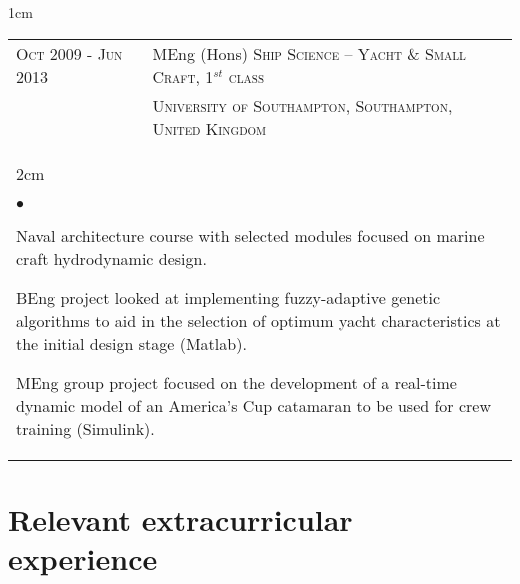 \documentclass[a4paper,10pt]{article}
\newcommand{\squishlist}{
	\begin{list}{$\bullet$}
	{
		\setlength{\itemsep}{0pt}
		\setlength{\parsep}{0pt}
		\setlength{\topsep}{0pt}
		\setlength{\partopsep}{0pt}
		\setlength{\leftmargin}{2em}
		\setlength{\labelwidth}{1.5em}
		\setlength{\labelsep}{0.5em}
	}
}
\newcommand{\squishend}{\end{list}}
\begin{document}
\begin{minipage}{\textwidth}
\begin{adjustwidth}{}{1cm}
\begin{tabular}{p{3.8cm} p{12.5cm}}
\textsc{Oct 2009 - Jun 2013} & MEng (Hons) \textsc{Ship Science – Yacht \& Small Craft, 1$^{st}$ class} \\
& \textsc{University of Southampton, Southampton, United Kingdom} \vspace{0.1cm} \\
%
\multicolumn{2}{l}{
\hspace{1cm}\begin{minipage}[t]{\textwidth}
\begin{adjustwidth}{}{2cm}
\squishlist
	\item Naval architecture course with selected modules focused on marine craft hydrodynamic design.
	\item BEng project looked at implementing fuzzy-adaptive genetic algorithms to aid in the selection
		of optimum yacht characteristics at the initial design stage (Matlab).
	\item MEng group project focused on the development of a real-time dynamic model of an America's Cup
		catamaran to be used for crew training (Simulink).
\squishend
\end{adjustwidth}
\end{minipage}
} \\

\end{tabular}

\end{adjustwidth}
\end{minipage}


\section{Relevant extracurricular experience}
\end{document}
